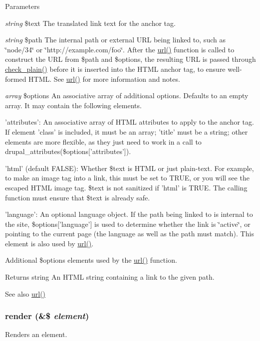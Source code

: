 \begin{DoxyParams}{Parameters}
\item[{\em string}]\$text The translated link text for the anchor tag. \item[{\em string}]\$path The internal path or external URL being linked to, such as \char`\"{}node/34\char`\"{} or \char`\"{}http://example.com/foo\char`\"{}. After the \hyperlink{common_8inc_a43b2a0594431556db49df980801d8807}{url()} function is called to construct the URL from \$path and \$options, the resulting URL is passed through \hyperlink{group__sanitization_ga76fc67a30fd8d75ddd80565e6e65a13d}{check\_\-plain()} before it is inserted into the HTML anchor tag, to ensure well-\/formed HTML. See \hyperlink{common_8inc_a43b2a0594431556db49df980801d8807}{url()} for more information and notes. \item[{\em array}]\$options An associative array of additional options. Defaults to an empty array. It may contain the following elements.
\begin{DoxyItemize}
\item 'attributes': An associative array of HTML attributes to apply to the anchor tag. If element 'class' is included, it must be an array; 'title' must be a string; other elements are more flexible, as they just need to work in a call to drupal\_\-attributes(\$options\mbox{[}'attributes'\mbox{]}).
\item 'html' (default FALSE): Whether \$text is HTML or just plain-\/text. For example, to make an image tag into a link, this must be set to TRUE, or you will see the escaped HTML image tag. \$text is not sanitized if 'html' is TRUE. The calling function must ensure that \$text is already safe.
\item 'language': An optional language object. If the path being linked to is internal to the site, \$options\mbox{[}'language'\mbox{]} is used to determine whether the link is \char`\"{}active\char`\"{}, or pointing to the current page (the language as well as the path must match). This element is also used by \hyperlink{common_8inc_a43b2a0594431556db49df980801d8807}{url()}.
\item Additional \$options elements used by the \hyperlink{common_8inc_a43b2a0594431556db49df980801d8807}{url()} function.
\end{DoxyItemize}\end{DoxyParams}
\begin{DoxyReturn}{Returns}
string An HTML string containing a link to the given path.
\end{DoxyReturn}
\begin{DoxySeeAlso}{See also}
\hyperlink{common_8inc_a43b2a0594431556db49df980801d8807}{url()} 
\end{DoxySeeAlso}
\hypertarget{common_8inc_a5f4b2009c1caf78549203cec9b324305}{
\subsubsection[{render}]{\setlength{\rightskip}{0pt plus 5cm}render (\&\$ {\em element})}}
\label{common_8inc_a5f4b2009c1caf78549203cec9b324305}
Renders an element.


